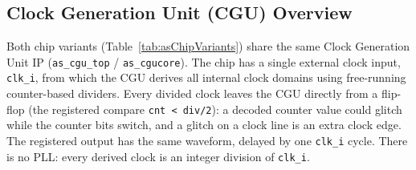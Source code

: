
\subsection{Clock Generation Unit (CGU) Overview}
\label{subsec:cguOverview}

Both chip variants (Table~\ref{tab:asChipVariants}) share the same Clock
Generation Unit IP (\texttt{as\_cgu\_top} / \texttt{as\_cgucore}).
The chip has a single external clock input, \texttt{clk\_i}, from which the
CGU derives all internal clock domains using free-running counter-based
dividers. Every divided clock leaves the CGU directly from a flip-flop (the
registered compare \texttt{cnt < div/2}): a decoded counter value could
glitch while the counter bits switch, and a glitch on a clock line is an
extra clock edge. The registered output has the same waveform, delayed by one
\texttt{clk\_i} cycle.
There is no PLL: every derived clock is an integer division of \texttt{clk\_i}.

